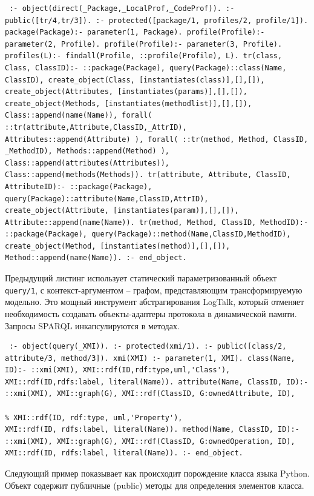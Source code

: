 \documentclass[conference]{IEEEtran} \IEEEoverridecommandlockouts
\begin{document}
\begin{verbatim} :- object(direct(_Package,_LocalProf,_CodeProf)). :- public([tr/4,tr/3]). :- protected([package/1, profiles/2, profile/1]). package(Package):- parameter(1, Package). profile(Profile):- parameter(2, Profile). profile(Profile):- parameter(3, Profile). profiles(L):- findall(Profile, ::profile(Profile), L). tr(class, Class, ClassID):- ::package(Package), query(Package)::class(Name, ClassID), create_object(Class, [instantiates(class)],[],[]), create_object(Attributes, [instantiates(params)],[],[]), create_object(Methods, [instantiates(methodlist)],[],[]), Class::append(name(Name)), forall( ::tr(attribute,Attribute,ClassID,_AttrID), Attributes::append(Attribute) ), forall( ::tr(method, Method, ClassID, _MethodID), Methods::append(Method) ), Class::append(attributes(Attributes)), Class::append(methods(Methods)). tr(attribute, Attribute, ClassID, AttributeID):- ::package(Package), query(Package)::attribute(Name,ClassID,AttrID), create_object(Attribute, [instantiates(param)],[],[]), Attribute::append(name(Name)). tr(method, Method, ClassID, MethodID):- ::package(Package), query(Package)::method(Name,ClassID,MethodID), create_object(Method, [instantiates(method)],[],[]), Method::append(name(Name)). :- end_object. \end{verbatim} 

Предыдущий листинг использует статический параметризованный объект \verb|query/1|, с контекст-аргументом -- графом, представляющим трансформируемую модельно. Это мощный инструмент абстрагирования LogTalk, который отменяет необходимость создавать объекты-адаптеры протокола в динамической памяти. Запросы SPARQL инкапсулируются в методах. 

\begin{verbatim} :- object(query(_XMI)). :- protected(xmi/1). :- public([class/2, attribute/3, method/3]). xmi(XMI) :- parameter(1, XMI). class(Name, ID):- ::xmi(XMI), XMI::rdf(ID,rdf:type,uml,'Class'), XMI::rdf(ID,rdfs:label, literal(Name)). attribute(Name, ClassID, ID):- ::xmi(XMI), XMI::graph(G), XMI::rdf(ClassID, G:ownedAttribute, ID), 

% XMI::rdf(ID, rdf:type, uml,'Property'),
XMI::rdf(ID, rdfs:label, literal(Name)). method(Name, ClassID, ID):- ::xmi(XMI), XMI::graph(G), XMI::rdf(ClassID, G:ownedOperation, ID), XMI::rdf(ID, rdfs:label, literal(Name)). :- end_object. \end{verbatim} 

Следующий пример показывает как происходит порождение класса языка Python. Объект содержит публичные (public) методы для определения элементов класса. 
\end{document}
